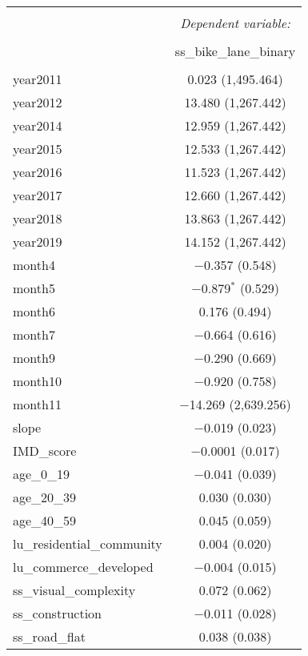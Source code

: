 \begin{table}[!htbp] \centering 
  \caption{} 
  \label{} 
\small 
\begin{tabular}{@{\extracolsep{1pt}}lc} 
\\[-1.8ex]\hline 
\hline \\[-1.8ex] 
 & \multicolumn{1}{c}{\textit{Dependent variable:}} \\ 
\cline{2-2} 
\\[-1.8ex] & ss\_bike\_lane\_binary \\ 
\hline \\[-1.8ex] 
 year2011 & 0.023 (1,495.464) \\ 
  year2012 & 13.480 (1,267.442) \\ 
  year2014 & 12.959 (1,267.442) \\ 
  year2015 & 12.533 (1,267.442) \\ 
  year2016 & 11.523 (1,267.442) \\ 
  year2017 & 12.660 (1,267.442) \\ 
  year2018 & 13.863 (1,267.442) \\ 
  year2019 & 14.152 (1,267.442) \\ 
  month4 & $-$0.357 (0.548) \\ 
  month5 & $-$0.879$^{*}$ (0.529) \\ 
  month6 & 0.176 (0.494) \\ 
  month7 & $-$0.664 (0.616) \\ 
  month9 & $-$0.290 (0.669) \\ 
  month10 & $-$0.920 (0.758) \\ 
  month11 & $-$14.269 (2,639.256) \\ 
  slope & $-$0.019 (0.023) \\ 
  IMD\_score & $-$0.0001 (0.017) \\ 
  age\_0\_19 & $-$0.041 (0.039) \\ 
  age\_20\_39 & 0.030 (0.030) \\ 
  age\_40\_59 & 0.045 (0.059) \\ 
  lu\_residential\_community & 0.004 (0.020) \\ 
  lu\_commerce\_developed & $-$0.004 (0.015) \\ 
  ss\_visual\_complexity & 0.072 (0.062) \\ 
  ss\_construction & $-$0.011 (0.028) \\ 
  ss\_road\_flat & 0.038 (0.038) \\ 

\end{tabular}
\end{table}
